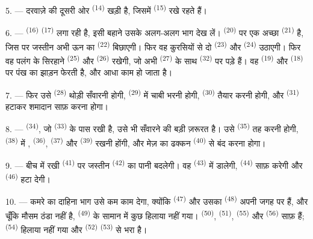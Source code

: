 5. --- दरवाज़े की दूसरी ओर  \textsuperscript{(14)} खड़ी है,
जिसमें  \textsuperscript{(15)} रखे रहते हैं।

6. ---  \textsuperscript{(16)}  \textsuperscript{(17)}
लगा रही है, इसी बहाने उसके अलग-अलग भाग देख लें। 
\textsuperscript{(20)} पर एक अच्छा  \textsuperscript{(21)} है,
जिस पर जस्तीन अभी ऊन का  \textsuperscript{(22)} बिछाएगी। फिर वह
कुरसियों से दो  \textsuperscript{(23)} और 
\textsuperscript{(24)} उठाएगी। फिर वह पलंग के सिरहाने 
\textsuperscript{(25)} और  \textsuperscript{(26)} रखेगी, जो अभी
 \textsuperscript{(27)} के साथ 
\textsuperscript{(32)} पर पड़े हैं। वह  \textsuperscript{(19)} और
 \textsuperscript{(18)} पर पंख का झाड़न फेरती है, और आधा काम हो जाता
है।

7. --- फिर उसे  \textsuperscript{(28)} थोड़ी सँवारनी
होगी,  \textsuperscript{(29)} में चाबी भरनी होगी,
 \textsuperscript{(30)} तैयार करनी होगी, और
 \textsuperscript{(31)} हटाकर शमादान साफ़ करना होगा।

\VUsaut{5.0mm}
\VUsaut{3.0mm}

8. ---  \textsuperscript{(34)}, जो 
\textsuperscript{(33)} के पास रखी है, उसे भी सँवारने की बड़ी ज़रूरत है। उसे 
\textsuperscript{(35)} तह करनी होगी,  \textsuperscript{(38)} में
,  \textsuperscript{(36)}, 
\textsuperscript{(37)} और  \textsuperscript{(39)} रखनी होंगी, और मेज़
का ढक्कन  \textsuperscript{(40)} से बंद करना होगा।

9. --- बीच में रखी  \textsuperscript{(41)} पर जस्तीन
 \textsuperscript{(42)} का पानी बदलेगी। वह 
\textsuperscript{(43)} में  डालेगी, 
\textsuperscript{(44)} साफ़ करेगी और  \textsuperscript{(46)}
हटा देगी।

10. --- कमरे का दाहिना भाग उसे कम काम देगा, क्योंकि 
\textsuperscript{(47)} और उसका  \textsuperscript{(48)} अपनी जगह पर हैं,
और चूँकि मौसम ठंडा नहीं है,  \textsuperscript{(49)} के सामान में
कुछ हिलाया नहीं गया।  \textsuperscript{(50)}, 
\textsuperscript{(51)},  \textsuperscript{(55)} और
 \textsuperscript{(56)} साफ़ हैं; 
\textsuperscript{(54)} हिलाया नहीं गया और 
\textsuperscript{(52)}  \textsuperscript{(53)} से भरा है।

